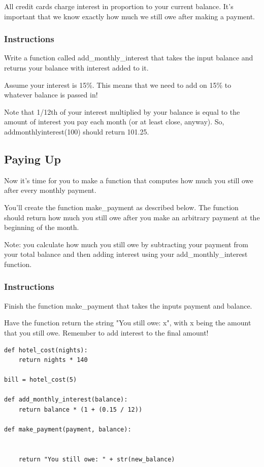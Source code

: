 \documentclass[12pt,a4paper,final,twoside,onecolumn,titlepage]{book}
\begin{document}
All credit cards charge interest in proportion to your current balance. It's important that we know exactly how much we still owe after making a payment.
\subsubsection{Instructions}

Write a function called add\_monthly\_interest that takes the input balance and returns your balance with interest added to it.

Assume your interest is 15\%. This means that we need to add on 15\% to whatever balance is passed in!

Note that 1/12th of your interest multiplied by your balance is equal to the amount of interest you pay each month (or at least close, anyway). So, addmonthlyinterest(100) should return 101.25.

\subsection{Paying Up}

Now it's time for you to make a function that computes how much you still owe after every monthly payment.

You'll create the function make\_payment as described below. The function should return how much you still owe after you make an arbitrary payment at the beginning of the month.

Note: you calculate how much you still owe by subtracting your payment from your total balance and then adding interest using your add\_monthly\_interest function.
\subsubsection{Instructions}

Finish the function make\_payment that takes the inputs payment and balance.

Have the function return the string "You still owe: x", with x being the amount that you still owe. Remember to add interest to the final amount!

\begin{lstlisting}
def hotel_cost(nights):
    return nights * 140

bill = hotel_cost(5)

def add_monthly_interest(balance):
    return balance * (1 + (0.15 / 12))

def make_payment(payment, balance):
	
	
    return "You still owe: " + str(new_balance)
\end{lstlisting}
\end{document}
